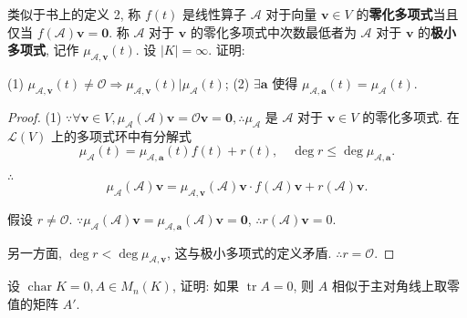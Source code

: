 \documentclass{ctexart}
\begin{document}
\begin{exercise}%
    类似于书上的定义 2, 称 $f(t)$ 是线性算子 $\mathcal{A}$ 对于向量 $\boldsymbol{v}\in V$ 的\textbf{零化多项式}当且仅当 $f(\mathcal{A})\boldsymbol{v}=\boldsymbol{0}$. 称 $\mathcal{A}$ 对于 $\boldsymbol{v}$ 的零化多项式中次数最低者为 $\mathcal{A}$ 对于 $\boldsymbol{v}$ 的\textbf{极小多项式}, 记作 $\mu_{\mathcal{A},\boldsymbol{v}}(t)$. 设 $|K|=\infty$. 证明:

    (1) $\mu_{\mathcal{A},\boldsymbol{v}}(t)\neq\mathcal{O}\Rightarrow\mu_{\mathcal{A},\boldsymbol{v}}(t)|\mu_{\mathcal{A}}(t)$; (2) $\exists\boldsymbol{a}$ 使得 $\mu_{\mathcal{A},\boldsymbol{a}}(t)=\mu_{\mathcal{A}}(t)$.
\end{exercise}
\begin{proof}
    (1) $\because\forall\boldsymbol{v}\in V,\mu_{\mathcal{A}}(\mathcal{A})\boldsymbol{v}=\mathcal{O}\boldsymbol{v}=\boldsymbol{0},\therefore\mu_{\mathcal{A}}$ 是 $\mathcal{A}$ 对于 $\boldsymbol{v}\in V$ 的零化多项式. 在 $\mathcal{L}(V)$ 上的多项式环中有分解式
    \[\mu_{\mathcal{A}}(t)=\mu_{\mathcal{A},\boldsymbol{a}}(t)f(t)+r(t),\quad\deg r\leq\deg\mu_{\mathcal{A},\boldsymbol{a}}.\]

    $\therefore$
    \[\mu_{\mathcal{A}}(\mathcal{A})\boldsymbol{v}=\mu_{\mathcal{A},\boldsymbol{v}}(\mathcal{A})\boldsymbol{v}\cdot f(\mathcal{A})\boldsymbol{v}+r(\mathcal{A})\boldsymbol{v}.\]

    假设 $r\neq\mathcal{O}$. $\because\mu_{\mathcal{A}}(\mathcal{A})\boldsymbol{v}=\mu_{\mathcal{A},\boldsymbol{a}}(\mathcal{A})\boldsymbol{v}=\boldsymbol{0}$, $\therefore r(\mathcal{A})\boldsymbol{v}=0$.
    
    另一方面, $\deg r<\deg\mu_{\mathcal{A},\boldsymbol{v}}$, 这与极小多项式的定义矛盾. $\therefore r=\mathcal{O}$.
\end{proof}
\begin{exercise}\label{ex2.11}
    设 $\operatorname{char}K=0,A\in M_n(K)$, 证明: 如果 $\operatorname{tr}A=0$, 则 $A$ 相似于主对角线上取零值的矩阵 $A'$.
\end{exercise}
\end{document}
